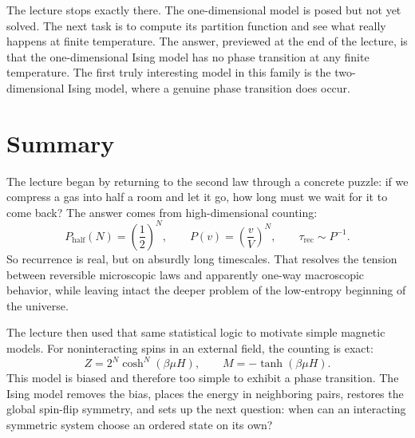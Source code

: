 The lecture stops exactly there. The one-dimensional model is posed but not yet solved. The next task is to compute its partition function and see what really happens at finite temperature. The answer, previewed at the end of the lecture, is that the one-dimensional Ising model has no phase transition at any finite temperature. The first truly interesting model in this family is the two-dimensional Ising model, where a genuine phase transition does occur.

\section{Summary}

The lecture began by returning to the second law through a concrete puzzle: if we compress a gas into half a room and let it go, how long must we wait for it to come back? The answer comes from high-dimensional counting:
\begin{equation}
P_{\mathrm{half}}(N)=\left(\frac{1}{2}\right)^N,
\qquad
P(v)=\left(\frac{v}{V}\right)^N,
\qquad
\tau_{\mathrm{rec}}\sim P^{-1}.
\end{equation}
So recurrence is real, but on absurdly long timescales. That resolves the tension between reversible microscopic laws and apparently one-way macroscopic behavior, while leaving intact the deeper problem of the low-entropy beginning of the universe.

The lecture then used that same statistical logic to motivate simple magnetic models. For noninteracting spins in an external field, the counting is exact:
\begin{equation}
Z=2^N\cosh^N(\beta\mu H),
\qquad
M=-\tanh(\beta\mu H).
\end{equation}
This model is biased and therefore too simple to exhibit a phase transition. The Ising model removes the bias, places the energy in neighboring pairs, restores the global spin-flip symmetry, and sets up the next question: when can an interacting symmetric system choose an ordered state on its own?